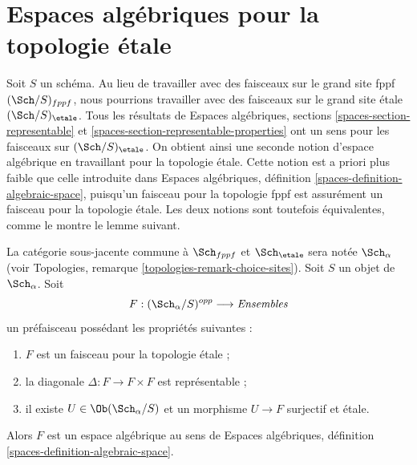 \section{Espaces algébriques pour la topologie étale}
\label{section-spaces-etale}

\noindent
Soit $S$ un schéma. Au lieu de travailler avec des faisceaux sur
le grand site fppf $(\Sch/S)_{fppf}$, nous pourrions travailler avec des faisceaux
sur le grand site étale $(\Sch/S)_\etale$. Tous les résultats de
Espaces algébriques, sections \ref{spaces-section-representable} et
\ref{spaces-section-representable-properties}
ont un sens pour les faisceaux sur $(\Sch/S)_\etale$.
On obtient ainsi une seconde notion d'espace algébrique en travaillant pour la
topologie étale. Cette notion est a priori plus faible que celle introduite dans
Espaces algébriques, définition \ref{spaces-definition-algebraic-space},
puisqu'un faisceau pour la topologie fppf est assurément un faisceau pour la
topologie étale. Les deux notions sont toutefois équivalentes, comme le montre le
lemme suivant.

\begin{lemma}
\label{lemma-spaces-etale}
La catégorie sous-jacente commune à $\Sch_{fppf}$ et $\Sch_\etale$ sera notée
$\Sch_\alpha$
(voir Topologies, remarque \ref{topologies-remark-choice-sites}).
Soit $S$ un objet de $\Sch_\alpha$. Soit
$$
F : (\Sch_\alpha/S)^{opp} \longrightarrow \textit{Ensembles}
$$
un préfaisceau possédant les propriétés suivantes :
\begin{enumerate}
\item $F$ est un faisceau pour la topologie étale ;
\item la diagonale $\Delta : F \to F \times F$ est représentable ;
\item il existe $U \in \Ob(\Sch_\alpha/S)$
et un morphisme $U \to F$ surjectif et étale.
\end{enumerate}
Alors $F$ est un espace algébrique au sens de
Espaces algébriques, définition \ref{spaces-definition-algebraic-space}.
\end{lemma}

